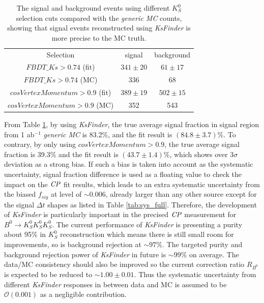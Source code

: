 \begin{table}[htpb]
	\centering
	\caption{The signal and background events using different $K_S^0$ selection cuts compared with the \textit{generic MC} counts, showing that signal events reconstructed using \textit{KsFinder} is more precise to the MC truth. }
	\label{tab:ksbias}
	\begin{tabular}{c| c |c}
		\hline
		Selection & signal  & background \\
		${FBDT\_Ks>0.74}$ (fit) & $341\pm20$ & $61\pm17$ \\
		${FBDT\_Ks>0.74}$ (MC) & 336 & 68\\
		${cosVertexMomentum>0.9}$ (fit) & $389\pm19$ & $502\pm15$\\
		${cosVertexMomentum>0.9}$ (MC) & 352 & 543\\
		\hline
	\end{tabular}
\end{table}

From Table \ref{tab:ksbias}, by using \textit{KsFinder}, the true average signal fraction in signal region from 1 ab$^{-1}$ \textit{generic MC} is 83.2\%, and the fit result is $(84.8\pm3.7)\%$. To contrary, by only using ${cosVertexMomentum>0.9}$, the true average signal fraction is 39.3\% and the fit result is $(43.7\pm1.4)\%$, which shows over $3\sigma$ deviation as a strong bias. If such a bias is taken into account as the systematic uncertainty, signal fraction difference is used as a floating value to check the impact on the $\it{CP}$ fit results, which leads to an extra systematic uncertainty from the biased $f_{sig}$ at level of $\sim 0.006$, already larger than any other source except for the signal $\Delta t$ shapes as listed in Table \ref{tab:sys_full}. Therefore, the development of \textit{KsFinder} is particularly important in the precised $\it{CP}$ measurement for $B^0 \to K_S^0  K_S^0  K_S^0$. The current performance of \textit{KsFinder} is presenting a purity about 95\% in $K_S^0$ reconstruction which means there is still small room for improvements, so is background rejection at $\sim97\%$. The targeted purity and background rejection power of \textit{KsFinder} in future is $\sim 99\%$ on average. The data/MC consistency should also be improved so the current correction ratio $R_{B^0}$ is expected to be reduced to $\sim 1.00\pm 0.01$. Thus the systematic uncertainty from different \textit{KsFinder} responses in between data and MC is assumed to be $\mathcal{O}(0.001)$ as a negligible contribution. 



